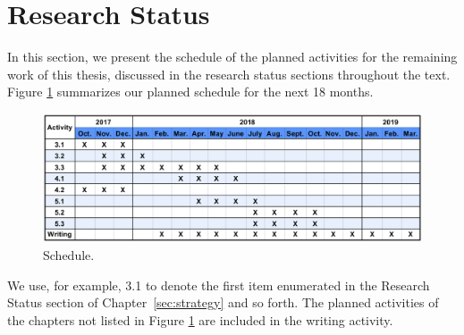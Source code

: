 
\section{Research Status}
In this section, we present the schedule of the planned activities for the remaining work of this thesis, discussed in the research status sections throughout the text.
Figure \ref{fig:summary-next-steps} summarizes our planned schedule for the next 18 months. 


\begin{figure}[ht]
	\begin{center}
		\includegraphics[scale=0.40]{images/Summary-Next-Steps.png}
		\caption{Schedule.}
		\label{fig:summary-next-steps}
	\end{center}
\end{figure}

We use, for example, 3.1 to denote the first item enumerated in the Research Status section of Chapter~\ref{sec:strategy} and so forth. 
The planned activities of the chapters not listed in Figure \ref{fig:summary-next-steps} are included in the writing activity.